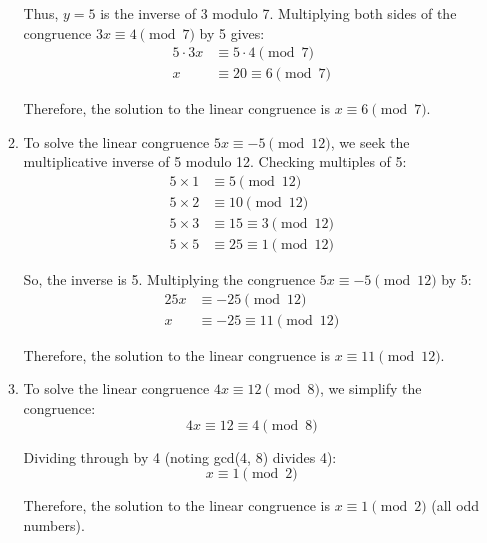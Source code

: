\documentclass[a4paper]{article}
\begin{document}
\begin{enumerate}
\begin{enumerate}
            Thus, \(y = 5\) is the inverse of 3 modulo 7. Multiplying both sides of the congruence \(3x \equiv 4 \pmod{7}\) by 5 gives:
            \[
                \begin{split}
                    5 \cdot 3x &\equiv 5 \cdot 4 \pmod{7} \\
                    x &\equiv 20 \equiv 6 \pmod{7}
                \end{split}
            \]

            Therefore, the solution to the linear congruence is \(x \equiv 6 \pmod{7}\). \\

            \item To solve the linear congruence \(5x \equiv -5 \pmod{12}\), we seek the multiplicative inverse of 5 modulo 12. Checking multiples of 5:
            \[
                \begin{split}
                    5 \times 1 &\equiv 5 \pmod{12} \\
                    5 \times 2 &\equiv 10 \pmod{12} \\
                    5 \times 3 &\equiv 15 \equiv 3 \pmod{12} \\
                    5 \times 5 &\equiv 25 \equiv 1 \pmod{12}
                \end{split}
            \]

            So, the inverse is 5. Multiplying the congruence \(5x \equiv -5 \pmod{12}\) by 5:
            \[
                \begin{split}
                    25x &\equiv -25 \pmod{12} \\
                    x &\equiv -25 \equiv 11 \pmod{12}
                \end{split}
            \]

            Therefore, the solution to the linear congruence is \(x \equiv 11 \pmod{12}\). \\

            \item To solve the linear congruence \(4x \equiv 12 \pmod{8}\), we simplify the congruence:
            \[
                4x \equiv 12 \equiv 4 \pmod{8}
            \]

            Dividing through by 4 (noting gcd(4, 8) divides 4):
            \[
                x \equiv 1 \pmod{2}
            \]

            Therefore, the solution to the linear congruence is \(x \equiv 1 \pmod{2}\) (all odd numbers). \\


\end{enumerate}
\end{enumerate}
\end{document}

